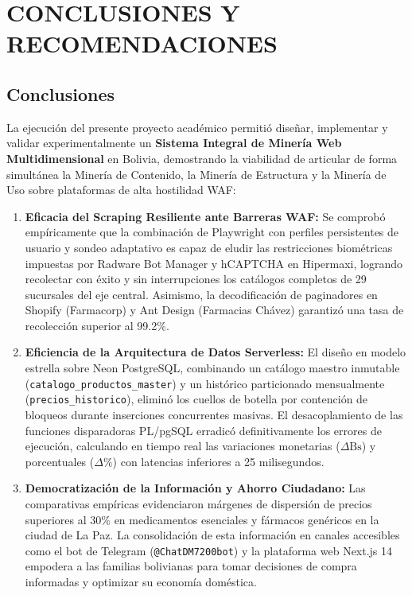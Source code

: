 \section{CONCLUSIONES Y RECOMENDACIONES}

\subsection{Conclusiones}
La ejecución del presente proyecto académico permitió diseñar, implementar y validar experimentalmente un \textbf{Sistema Integral de Minería Web Multidimensional} en Bolivia, demostrando la viabilidad de articular de forma simultánea la Minería de Contenido, la Minería de Estructura y la Minería de Uso sobre plataformas de alta hostilidad WAF:

\begin{enumerate}[leftmargin=*]
    \item \textbf{Eficacia del Scraping Resiliente ante Barreras WAF:} Se comprobó empíricamente que la combinación de Playwright con perfiles persistentes de usuario y sondeo adaptativo es capaz de eludir las restricciones biométricas impuestas por Radware Bot Manager y hCAPTCHA en Hipermaxi, logrando recolectar con éxito y sin interrupciones los catálogos completos de 29 sucursales del eje central. Asimismo, la decodificación de paginadores en Shopify (Farmacorp) y Ant Design (Farmacias Chávez) garantizó una tasa de recolección superior al 99.2\%.
    
    \item \textbf{Eficiencia de la Arquitectura de Datos Serverless:} El diseño en modelo estrella sobre Neon PostgreSQL, combinando un catálogo maestro inmutable (\texttt{catalogo\_productos\_master}) y un histórico particionado mensualmente (\texttt{precios\_historico}), eliminó los cuellos de botella por contención de bloqueos durante inserciones concurrentes masivas. El desacoplamiento de las funciones disparadoras PL/pgSQL erradicó definitivamente los errores de ejecución, calculando en tiempo real las variaciones monetarias ($\Delta\text{Bs}$) y porcentuales ($\Delta\%$) con latencias inferiores a 25 milisegundos.
    
    \item \textbf{Democratización de la Información y Ahorro Ciudadano:} Las comparativas empíricas evidenciaron márgenes de dispersión de precios superiores al 30\% en medicamentos esenciales y fármacos genéricos en la ciudad de La Paz. La consolidación de esta información en canales accesibles como el bot de Telegram (\texttt{@ChatDM7200bot}) y la plataforma web Next.js 14 empodera a las familias bolivianas para tomar decisiones de compra informadas y optimizar su economía doméstica.
    

\end{enumerate}
